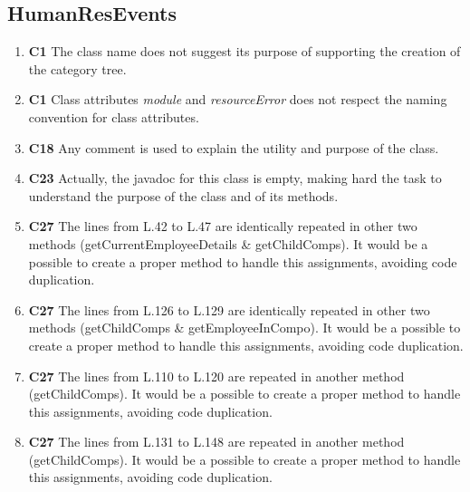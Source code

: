 \subsection{HumanResEvents}

\begin{enumerate}
	\item \textbf{C1} The class name does not suggest its purpose of supporting the creation of the category tree.
	
	\item \textbf{C1} Class attributes \textit{module} and \textit{resourceError} does not respect the naming convention for class attributes.
	
	\item \textbf{C18} Any comment is used to explain the utility and purpose of the class.
	
	\item \textbf{C23} Actually, the javadoc for this class is empty, making hard the task to understand the purpose of the class and of its methods.

	\item \textbf{C27} The lines from L.42 to L.47 are identically repeated in other two methods (getCurrentEmployeeDetails \& getChildComps). It would be a possible to create a proper method to handle this assignments, avoiding code duplication.

	\item \textbf{C27} The lines from L.126 to L.129 are identically repeated in other two methods (getChildComps \& getEmployeeInCompo). It would be a possible to create a proper method to handle this assignments, avoiding code duplication.

	\item \textbf{C27} The lines from L.110 to L.120 are repeated in another method (getChildComps). It would be a possible to create a proper method to handle this assignments, avoiding code duplication.

	\item \textbf{C27} The lines from L.131 to L.148 are repeated in another method (getChildComps). It would be a possible to create a proper method to handle this assignments, avoiding code duplication.
	
\end{enumerate}

